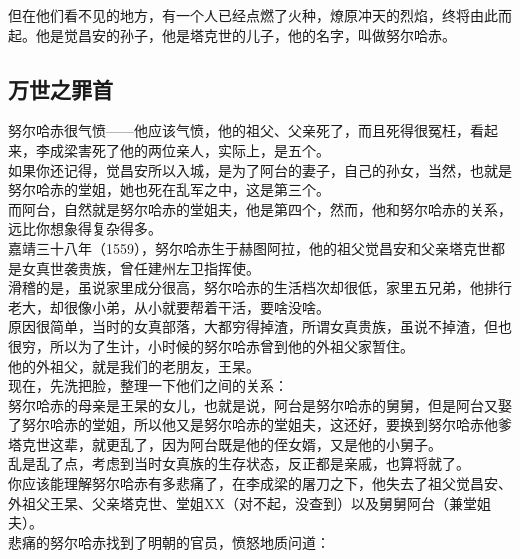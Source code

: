 \begin{multicols}{\theparacolNo}
但在他们看不见的地方，有一个人已经点燃了火种，燎原冲天的烈焰，终将由此而起。他是觉昌安的孙子，他是塔克世的儿子，他的名字，叫做努尔哈赤。\\

\subsection{万世之罪首}
努尔哈赤很气愤——他应该气愤，他的祖父、父亲死了，而且死得很冤枉，看起来，李成梁害死了他的两位亲人，实际上，是五个。\\

如果你还记得，觉昌安所以入城，是为了阿台的妻子，自己的孙女，当然，也就是努尔哈赤的堂姐，她也死在乱军之中，这是第三个。\\

而阿台，自然就是努尔哈赤的堂姐夫，他是第四个，然而，他和努尔哈赤的关系，远比你想象得复杂得多。\\

嘉靖三十八年（1559），努尔哈赤生于赫图阿拉，他的祖父觉昌安和父亲塔克世都是女真世袭贵族，曾任建州左卫指挥使。\\

滑稽的是，虽说家里成分很高，努尔哈赤的生活档次却很低，家里五兄弟，他排行老大，却很像小弟，从小就要帮着干活，要啥没啥。\\

原因很简单，当时的女真部落，大都穷得掉渣，所谓女真贵族，虽说不掉渣，但也很穷，所以为了生计，小时候的努尔哈赤曾到他的外祖父家暂住。\\

他的外祖父，就是我们的老朋友，王杲。\\

现在，先洗把脸，整理一下他们之间的关系：\\

努尔哈赤的母亲是王杲的女儿，也就是说，阿台是努尔哈赤的舅舅，但是阿台又娶了努尔哈赤的堂姐，所以他又是努尔哈赤的堂姐夫，这还好，要换到努尔哈赤他爹塔克世这辈，就更乱了，因为阿台既是他的侄女婿，又是他的小舅子。\\

乱是乱了点，考虑到当时女真族的生存状态，反正都是亲戚，也算将就了。\\

你应该能理解努尔哈赤有多悲痛了，在李成梁的屠刀之下，他失去了祖父觉昌安、外祖父王杲、父亲塔克世、堂姐XX（对不起，没查到）以及舅舅阿台（兼堂姐夫）。\\

悲痛的努尔哈赤找到了明朝的官员，愤怒地质问道：\\


\end{multicols}
